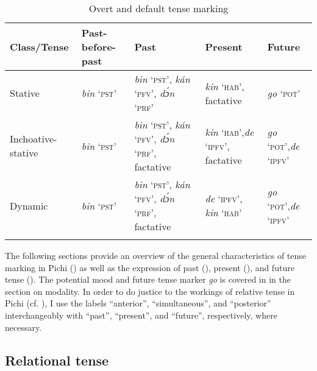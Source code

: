 \begin{table}
\caption{Overt and default tense marking}
\label{tab:key:6.7}

\begin{tabularx}{\textwidth}{QlQQQ}
\lsptoprule
Class/Tense & Past-before-past & Past & Present & Future\\
\midrule 
Stative & \textit{bin} ‘\textsc{pst}’ & \textit{bin} ‘\textsc{pst}’, \textit{kán} ‘\textsc{pfv}’, \textit{dɔ́n} ‘\textsc{prf’} & \textit{kin} ‘\textsc{hab’}, factative & \textit{go} ‘\textsc{pot}’\\
\tablevspace
Inchoative-stative & \textit{bin} ‘\textsc{pst’} & \textit{bin} ‘\textsc{pst’}, \textit{kán} ‘\textsc{pfv’}, \textit{dɔ́n} ‘\textsc{prf’}, factative & \textit{kin} ‘\textsc{hab’},\newline  \textit{de} ‘\textsc{ipfv’}, factative & \textit{go} ‘\textsc{pot’},\newline  \textit{de} ‘\textsc{ipfv’}\\
\tablevspace
Dynamic & \textit{bin} ‘\textsc{pst}’ & \textit{bin} ‘\textsc{pst}’, \textit{kán} ‘\textsc{pfv}’, \textit{dɔ́n} ‘\textsc{prf’}, factative & \textit{de} ‘\textsc{ipfv’}, \textit{kin} ‘\textsc{hab’} & \textit{go} ‘\textsc{pot}’,\newline \textit{de} ‘\textsc{ipfv}’\\
\lspbottomrule
\end{tabularx}
\end{table}
The following sections provide an overview of the general characteristics of tense marking in Pichi () as well as the expression of past (), present (), and future tense (). The potential mood and future tense marker \textit{go} is covered in  in the section on modality. In order to do justice to the workings of relative tense in Pichi (cf. ), I use the labels “anterior”, “simultaneous”, and “posterior” interchangeably with “past”, “present”, and “future”, respectively, where necessary.

\subsection{Relational tense}\label{sec:6.5.1}

